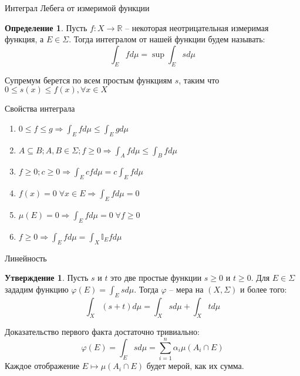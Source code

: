 \documentclass{beamer}%
\theoremstyle{definition}
\newtheorem{mydef}[theorem]{Определение}
\newtheorem{proposition}[theorem]{Утверждение}
\DeclareMathOperator{\sup}{sup}
\begin{document}
\begin{frame}{Интеграл Лебега от измеримой функции}
    \begin{mydef}
    Пусть $f: X \to \mathbb{R}$ -- некоторая неотрицательная измеримая функция, а $E \in \Sigma$. Тогда интегралом от нашей функции будем называть:
    $$
    \int_E f d\mu = \sup \int_E s d\mu
    $$
    \end{mydef}
    Супремум берется по всем простым функциям $s$, таким что $0 \leq s(x) \leq f(x), \forall x \in X$
\end{frame}

\begin{frame}{Свойства интеграла}
\begin{enumerate}
    \item $0 \leq f \leq g \Rightarrow \int_E f d\mu \leq \int_E g d\mu$
    
    \;
    
    \item $A \subseteq B; A, B \in \Sigma; f \geq 0 \Rightarrow 
    \int_A f d\mu \leq \int_B f d\mu$
    
    \;
    
    \item $f \geq 0; c \geq 0 \Rightarrow \int_E cf d\mu = c\int_E f d\mu$
    
    \;
    
    \item $f(x) = 0 \; \forall x \in E \Rightarrow \int_E fd\mu = 0$
    
    \;
    
    \item $\mu(E) = 0 \Rightarrow \int_E f d\mu = 0 \; \forall f \geq 0$
    
    \;
    
    \item $f \geq 0 \Rightarrow \int_E f d \mu = \int_X \mathbb{I}_E f d \mu$
\end{enumerate}
    
\end{frame}

\begin{frame}{Линейность}

\begin{proposition}
Пусть $s$ и $t$ это две простые функции $s \geq 0$ и $t \geq 0$. Для $E \in \Sigma$ зададим функцию $\varphi(E) = \int_E s d\mu$. Тогда $\varphi$ -- мера на $(X, \Sigma)$ и более того:
$$
\int_X (s+t)d\mu = \int_X s d\mu + \int_X t d\mu
$$
\end{proposition}

Доказательство первого факта достаточно тривиально:
$$
\varphi(E) = \int_E s d\mu = \sum_{i=1}^n  \alpha_i \mu (A_i \cap E)
$$
Каждое отображение $E \mapsto \mu(A_i \cap E)$ будет мерой, как их сумма.

\end{frame}
\end{document}

